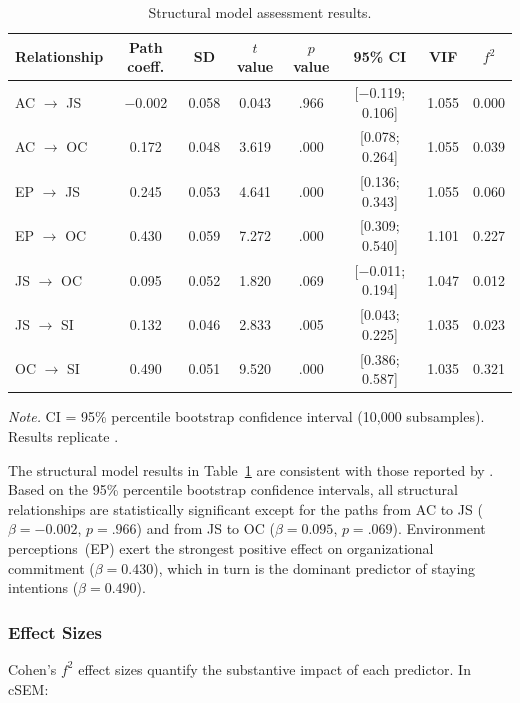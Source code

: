 \documentclass[12pt,a4paper]{article}\usepackage[]{graphicx}\usepackage[]{xcolor}
\newcommand{\pkg}[1]{\textsf{#1}}
\begin{document}
\begin{table}[htbp]
\centering
\caption{Structural model assessment results.}
\label{tab:structural}
\small
\begin{tabular}{lccccccc}
\toprule
Relationship & Path coeff. & SD & $t$ value & $p$ value & 95\% CI & VIF & $f^2$ \\
\midrule
AC $\to$ JS & $-$0.002 & 0.058 & 0.043 & .966 & [$-$0.119; 0.106] & 1.055 & 0.000 \\
AC $\to$ OC &    0.172 & 0.048 & 3.619 & .000 & [0.078; 0.264]    & 1.055 & 0.039 \\
EP $\to$ JS &    0.245 & 0.053 & 4.641 & .000 & [0.136; 0.343]    & 1.055 & 0.060 \\
EP $\to$ OC &    0.430 & 0.059 & 7.272 & .000 & [0.309; 0.540]    & 1.101 & 0.227 \\
JS $\to$ OC &    0.095 & 0.052 & 1.820 & .069 & [$-$0.011; 0.194] & 1.047 & 0.012 \\
JS $\to$ SI &    0.132 & 0.046 & 2.833 & .005 & [0.043; 0.225]    & 1.035 & 0.023 \\
OC $\to$ SI &    0.490 & 0.051 & 9.520 & .000 & [0.386; 0.587]    & 1.035 & 0.321 \\
\bottomrule
\end{tabular}

\smallskip
\footnotesize\textit{Note.} CI = 95\% percentile bootstrap confidence interval (10,000 subsamples). Results replicate \citet[Table~3]{Cheah2026}.
\end{table}

The structural model results in Table~\ref{tab:structural} are consistent with those reported by \citet[Table~3]{Cheah2026}. Based on the 95\% percentile bootstrap confidence intervals, all structural relationships are statistically significant except for the paths from AC to JS ($\beta = -0.002$, $p = .966$) and from JS to OC ($\beta = 0.095$, $p = .069$). Environment perceptions~(EP) exert the strongest positive effect on organizational commitment ($\beta = 0.430$), which in turn is the dominant predictor of staying intentions ($\beta = 0.490$).

\subsubsection{Effect Sizes}

Cohen's $f^2$ effect sizes quantify the substantive impact of each predictor. In \pkg{cSEM}:
\end{document}
